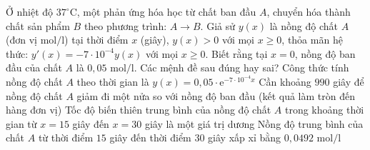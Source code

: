 \begin{ex}
 Ở nhiệt độ $37^\circ\text{C}$, một phản ứng hóa học từ chất ban đầu $A$, chuyển hóa thành chất sản phẩm $B$ theo phương trình: $A \rightarrow B$. Giả sử $y(x)$ là nồng độ chất $A$ (đơn vị $\text{mol/l}$) tại thời điểm $x$ (giây), $y(x) > 0$ với mọi $x \ge 0$, thỏa mãn hệ thức: $y'(x) = -7 \cdot 10^{-4} y(x)$ với mọi $x \ge 0$. Biết rằng tại $x=0$, nồng độ ban đầu của chất $A$ là $0{,}05\text{ mol/l}$. Các mệnh đề sau đúng hay sai?
 \choiceTF
 {\True Công thức tính nồng độ chất $A$ theo thời gian là $y(x) = 0{,}05 \cdot \mathrm{e}^{-7 \cdot 10^{-4} x}$}
 {\True Cần khoảng $990$ giây để nồng độ chất $A$ giảm đi một nửa so với nồng độ ban đầu (kết quả làm tròn đến hàng đơn vị)}
 {Tốc độ biến thiên trung bình của nồng độ chất $A$ trong khoảng thời gian từ $x = 15$ giây đến $x = 30$ giây là một giá trị dương}
 {\True Nồng độ trung bình của chất $A$ từ thời điểm $15$ giây đến thời điểm $30$ giây xấp xỉ bằng $0{,}0492\text{ mol/l}$}
\end{ex}
